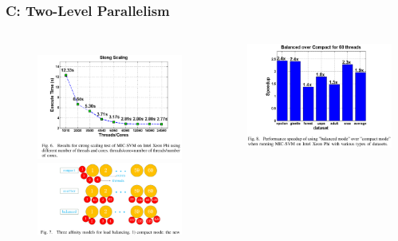 \documentclass{beamer}
\begin{document}
\begin{frame}
	\frametitle{C: Two-Level Parallelism}
	\begin{columns}[c] %
		\begin{figure}
			\includegraphics[width=0.9\textwidth]{fig/fig6_strongscaling.png} \\
			\includegraphics[width=0.9\textwidth]{fig/fig7_affinitymodel.png}
		\end{figure}
		\includegraphics[width=0.9\textwidth]{fig/fig8_balancedmode.png}

\end{columns}
\end{frame}
\end{document}
